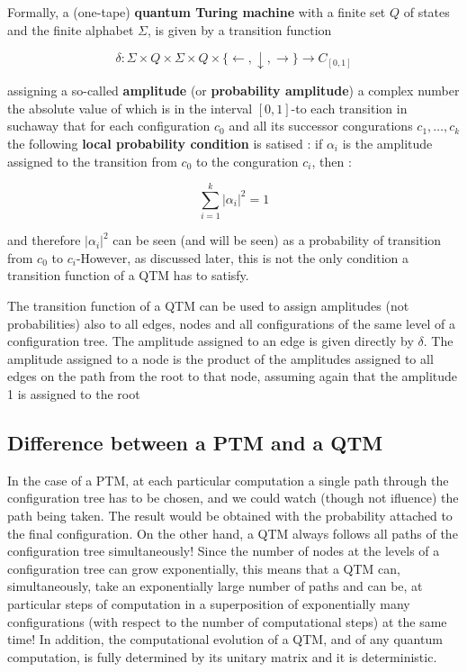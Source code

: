 \documentclass[12pt]{book}
\begin{document}
Formally, a (one-tape) \textbf{quantum Turing machine} with a finite set $Q$ of states and the finite alphabet $\Sigma$, is given by a transition function

$$
\delta : \Sigma \times Q \times \Sigma \times Q \times \{ \leftarrow, \downarrow , \rightarrow  \} \to C_{[0,1]}
$$



assigning a so-called \textbf{amplitude} (or \textbf{probability amplitude}) a complex number the absolute value of which is in the interval $[0,1]$-to each transition in suchaway that for
each configuration
$c_{0}$
and all its successor congurations $c_{1} , \dots ,  c_{k}$
the following \textbf{local probability condition} is satised : if $\alpha_{i}$
is the amplitude assigned to the transition from
$c_{0}$
to the conguration $c_{i}$,
then :


$$
\sum_{i=1}^{k}{|{\alpha_{i}|}^{2}} = 1
$$


and therefore $|{\alpha_{i}|}^{2}$
can be seen (and will be seen) as a probability of transition from $c_{0}$ to $c_{i}$-However, as discussed later, this is not the only condition a transition function of a QTM
has to satisfy.

The transition function of a QTM can be used to assign amplitudes (not probabilities)
also to all edges, nodes and all configurations of the same level of a configuration tree. The amplitude assigned to an edge is given directly by $\delta$. The amplitude assigned to a node is
the product of the amplitudes assigned to all edges on the path from the root to that node,
assuming again that the amplitude 1 is assigned to the root


\subsection{Difference between a PTM and a QTM}


In the case of a PTM, at each particular computation a single 
path through the configuration tree has to be chosen, and we 
could watch (though not ifluence) the path being
taken. The result would be obtained with the probability 
attached to the  final configuration.
On the other hand, a QTM always follows all paths of the 
configuration tree simultaneously! Since the number of nodes 
at the levels of a configuration tree can grow exponentially,
this means that a QTM can, simultaneously, take an 
exponentially large number of paths
and can be, at particular steps of computation in a 
superposition of exponentially many
configurations (with respect to the number of computational 
steps) at the same time! In addition, the computational 
evolution of a QTM, and of any quantum computation, is fully
determined by its unitary matrix and it is deterministic.
\end{document}
